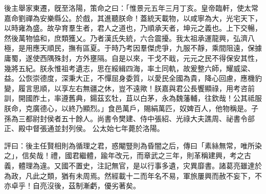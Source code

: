 \begin{pinyinscope}
 
後主舉家東遷，旣至洛陽，策命之曰：「惟景元五年三月丁亥。皇帝臨軒，使太常嘉命劉禪為安樂縣公。於戲，其進聽朕命！蓋統天載物，以咸寧為大，光宅天下，以時雍為盛。故孕育羣生者，君人之道也，乃順承天者，坤元之義也。上下交暢，然後萬物恊和，庶類獲乂。乃者漢氏失統，六合震擾。我太祖承運龍興，弘濟八極，是用應天順民，撫有區夏。于時乃考因羣傑虎爭，九服不靜，乘間阻遠，保據庸蜀，遂使西隅殊封，方外壅隔。自是以來，干戈不戢，元元之民不得保安其性，幾將五紀。朕永惟祖考遺志，思在綏緝四海，率土同軌，故爰整六師，耀威梁、益。公恢崇德度，深秉大正，不憚屈身委質，以愛民全國為貴，降心回慮，應機豹變，履言思順，以享左右無疆之休，豈不遠歟！朕嘉與君公長饗顯祿，用考咨前訓，開國胙土，率遵舊典，鍚茲玄牡，苴以白茅，永為魏藩輔，往欽哉！公其祗服朕命，克廣德心，以終乃顯烈。」食邑萬戶，賜絹萬匹，奴婢百人，他物稱是。子孫為三都尉封侯者五十餘人。尚書令樊建、侍中張紹、光祿大夫譙周、祕書令郤正、殿中督張通並封列侯。
 公太始七年薨於洛陽。
 
 
評曰：後主任賢相則為循理之君，惑閹豎則為昏闇之后，傳曰「素絲無常，唯所染之」，信矣哉！禮，國君繼體，踰年改元，而章武之三年，則革稱建興，考之古義，體理為違。又國不置史，注記無官，是以行事多遺，灾異靡書。諸葛亮雖達於為政，凡此之類，猶有未周焉。然經載十二而年名不易，軍旅屢興而赦不妄下，不亦卓乎！自亮沒後，茲制漸虧，優劣著矣。
 
 
\end{pinyinscope}